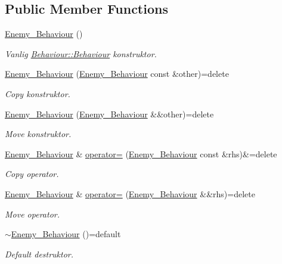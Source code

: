 \subsection*{Public Member Functions}
\begin{DoxyCompactItemize}
\item 
\hyperlink{classEnemy__Behaviour_a7f9664c16fb8882fb8fde685a965252e}{Enemy\+\_\+\+Behaviour} ()
\begin{DoxyCompactList}\small\item\em Vanlig \hyperlink{classBehaviour_a57e050961bc1305993adaeac62658657}{Behaviour\+::\+Behaviour} konstruktor. \end{DoxyCompactList}\item 
\hyperlink{classEnemy__Behaviour_acdcb3d585dd17edc510f0c24f956b798}{Enemy\+\_\+\+Behaviour} (\hyperlink{classEnemy__Behaviour}{Enemy\+\_\+\+Behaviour} const \&other)=delete
\begin{DoxyCompactList}\small\item\em Copy konstruktor. \end{DoxyCompactList}\item 
\hyperlink{classEnemy__Behaviour_ac46de3386a52bc87075f46f0c8b5e60d}{Enemy\+\_\+\+Behaviour} (\hyperlink{classEnemy__Behaviour}{Enemy\+\_\+\+Behaviour} \&\&other)=delete
\begin{DoxyCompactList}\small\item\em Move konstruktor. \end{DoxyCompactList}\item 
\hyperlink{classEnemy__Behaviour}{Enemy\+\_\+\+Behaviour} \& \hyperlink{classEnemy__Behaviour_a11392864d130739b2926f63c21d6fa77}{operator=} (\hyperlink{classEnemy__Behaviour}{Enemy\+\_\+\+Behaviour} const \&rhs)\&=delete
\begin{DoxyCompactList}\small\item\em Copy operator. \end{DoxyCompactList}\item 
\hyperlink{classEnemy__Behaviour}{Enemy\+\_\+\+Behaviour} \& \hyperlink{classEnemy__Behaviour_aae622d7ae52b4c03bdceec9f2081a34f}{operator=} (\hyperlink{classEnemy__Behaviour}{Enemy\+\_\+\+Behaviour} \&\&rhs)=delete
\begin{DoxyCompactList}\small\item\em Move operator. \end{DoxyCompactList}\item 
\hyperlink{classEnemy__Behaviour_ab04de6117d4cbb5fe310b022e9f2de96}{$\sim$\+Enemy\+\_\+\+Behaviour} ()=default
\begin{DoxyCompactList}\small\item\em Default destruktor. \end{DoxyCompactList}\item 

\end{DoxyCompactItemize}
